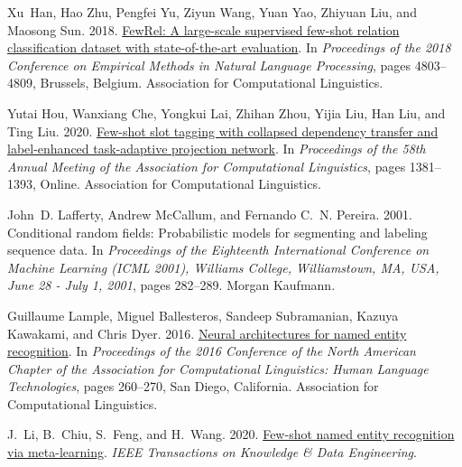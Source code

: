 \documentclass[11pt]{article}
\begin{document}
\begin{thebibliography}{45}
Xu~Han, Hao Zhu, Pengfei Yu, Ziyun Wang, Yuan Yao, Zhiyuan Liu, and Maosong
  Sun. 2018.
\newblock \href {https://doi.org/10.18653/v1/D18-1514} {{F}ew{R}el: A
  large-scale supervised few-shot relation classification dataset with
  state-of-the-art evaluation}.
\newblock In \emph{Proceedings of the 2018 Conference on Empirical Methods in
  Natural Language Processing}, pages 4803--4809, Brussels, Belgium.
  Association for Computational Linguistics.

Yutai Hou, Wanxiang Che, Yongkui Lai, Zhihan Zhou, Yijia Liu, Han Liu, and Ting
  Liu. 2020.
\newblock \href {https://doi.org/10.18653/v1/2020.acl-main.128} {Few-shot slot
  tagging with collapsed dependency transfer and label-enhanced task-adaptive
  projection network}.
\newblock In \emph{Proceedings of the 58th Annual Meeting of the Association
  for Computational Linguistics}, pages 1381--1393, Online. Association for
  Computational Linguistics.

John~D. Lafferty, Andrew McCallum, and Fernando C.~N. Pereira. 2001.
\newblock Conditional random fields: Probabilistic models for segmenting and
  labeling sequence data.
\newblock In \emph{Proceedings of the Eighteenth International Conference on
  Machine Learning {(ICML} 2001), Williams College, Williamstown, MA, USA, June
  28 - July 1, 2001}, pages 282--289. Morgan Kaufmann.

Guillaume Lample, Miguel Ballesteros, Sandeep Subramanian, Kazuya Kawakami, and
  Chris Dyer. 2016.
\newblock \href {https://doi.org/10.18653/v1/N16-1030} {Neural architectures
  for named entity recognition}.
\newblock In \emph{Proceedings of the 2016 Conference of the North {A}merican
  Chapter of the Association for Computational Linguistics: Human Language
  Technologies}, pages 260--270, San Diego, California. Association for
  Computational Linguistics.

J.~Li, B.~Chiu, S.~Feng, and H.~Wang. 2020{}.
\newblock \href {https://doi.org/10.1109/TKDE.2020.3038670} {Few-shot named
  entity recognition via meta-learning}.
\newblock \emph{IEEE Transactions on Knowledge \& Data Engineering}.


\end{thebibliography}
\end{document}
